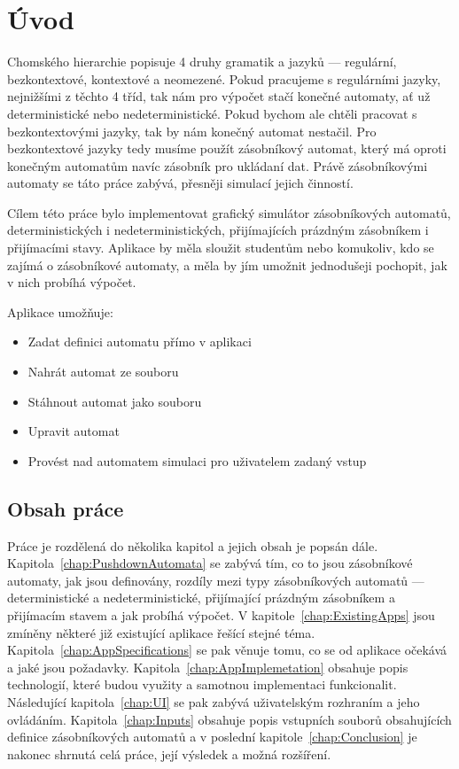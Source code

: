 \chapter{Úvod}    
Chomského hierarchie popisuje 4 druhy gramatik a jazyků --- regulární, bezkontextové, kontextové a neomezené. Pokud pracujeme s regulárními jazyky, nejnižšími z těchto 4 tříd, tak nám pro výpočet stačí konečné automaty, ať už deterministické nebo nedeterministické. Pokud bychom ale chtěli pracovat s bezkontextovými jazyky, tak by nám konečný automat nestačil. Pro bezkontextové jazyky tedy musíme použít zásobníkový automat, který má oproti konečným automatům navíc zásobník pro ukládaní dat. Právě zásobníkovými automaty se táto práce zabývá, přesněji simulací jejich činností.

Cílem této práce bylo implementovat grafický simulátor zásobníkových automatů, deterministických i nedeterministických, přijímajících prázdným zásobníkem i přijímacími stavy. Aplikace by měla sloužit studentům nebo komukoliv, kdo se zajímá o zásobníkové automaty, a měla by jím umožnit jednodušeji pochopit, jak v nich probíhá výpočet.

Aplikace umožňuje:
\begin{itemize}
    \item Zadat definici automatu přímo v aplikaci
    \item Nahrát automat ze souboru
    \item Stáhnout automat jako souboru
    \item Upravit automat
    \item Provést nad automatem simulaci pro uživatelem zadaný vstup
\end{itemize}

\section{Obsah práce}

Práce je rozdělená do několika kapitol a jejich obsah je popsán dále. Kapitola~\ref{chap:PushdownAutomata} se zabývá tím, co to jsou zásobníkové automaty, jak jsou definovány, rozdíly mezi typy zásobníkových automatů --- deterministické a nedeterministické, přijímající prázdným zásobníkem a přijímacím stavem a jak probíhá výpočet. V kapitole~\ref{chap:ExistingApps} jsou zmíněny některé již existující aplikace řešící stejné téma. Kapitola~\ref{chap:AppSpecifications} se pak věnuje tomu, co se od aplikace očekává a jaké jsou požadavky. Kapitola~\ref{chap:AppImplemetation} obsahuje popis technologií, které budou využity a samotnou implementaci funkcionalit. Následující kapitola~\ref{chap:UI} se pak zabývá uživatelským rozhraním a jeho ovládáním. Kapitola~\ref{chap:Inputs} obsahuje popis vstupních souborů obsahujících definice zásobníkových automatů a v poslední kapitole~\ref{chap:Conclusion} je nakonec shrnutá celá práce, její výsledek a možná rozšíření.
\endinput